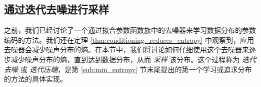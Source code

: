\documentclass[../../book-main.tex]{subfiles}
\begin{document}



\subsection{通过迭代去噪进行采样}


之前，我们已经讨论了一个通过拟合参数函数族中的去噪器来学习数据分布的参数编码的方法。我们还在定理 \ref{thm:conditioning_reduces_entropy} 中观察到，应用去噪器会减少噪声分布的熵。在本节中，我们将讨论如何仔细使用这个去噪器来逐步减少噪声分布的熵，直到达到数据分布，从而 \textit{采样} 该分布。这个过程称为 \textit{迭代去噪} 或 \textit{迭代压缩}，是第 \ref{sub:min_entropy} 节末尾提出的第一个学习或追求分布的方法的具体实现。
\end{document}
